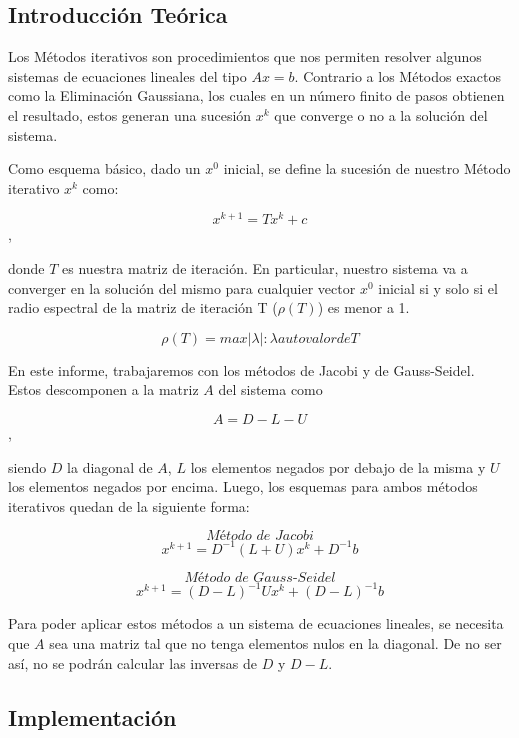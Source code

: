 
\vspace{2em}
\subsection{Introducción Teórica}

Los Métodos iterativos son procedimientos que nos permiten resolver algunos sistemas de ecuaciones lineales del tipo $Ax = b$. Contrario a los Métodos exactos como la Eliminación Gaussiana, los cuales en un número finito de pasos obtienen el resultado, estos generan una sucesión {$x^{k}$} que converge o no a la solución del sistema.

Como esquema básico, dado un $x^{0}$ inicial, se define la sucesión de nuestro Método iterativo {$x^{k}$} como:

\begin{equation}\label{sucesion}
    x^{k+1} = Tx^k + c
\end{equation},

donde $T$ es nuestra matriz de iteración. En particular, nuestro sistema va a converger en la solución del mismo para cualquier vector $x^0$ inicial si y solo si el radio espectral de la matriz de iteración T ($\rho(T)$) es menor a 1.

\begin{equation}\label{radio espectral}
    \rho(T) = max{|\lambda| : \lambda autovalor de T}
\end{equation}

En este informe, trabajaremos con los métodos de Jacobi y de Gauss-Seidel. Estos descomponen a la matriz $A$ del sistema como 

\begin{displaymath}
    A = D - L - U
\end{displaymath},

siendo $D$ la diagonal de $A$, $L$ los elementos negados por debajo de la misma y $U$ los elementos negados por encima. Luego, los esquemas para ambos métodos iterativos quedan de la siguiente forma:

$$\textit{Método de Jacobi}$$
\begin{equation}\label{jacobi}
    x^{k+1} = D^{-1} (L + U) x^k + D^{-1} b
\end{equation}

$$\textit{Método de Gauss-Seidel}$$
\begin{equation}\label{gauss-seidel}
    x^{k+1} = (D - L)^{-1} U x^k + (D - L)^{-1} b
\end{equation}

Para poder aplicar estos métodos a un sistema de ecuaciones lineales, se necesita que $A$ sea una matriz tal que no tenga elementos nulos en la diagonal. De no ser así, no se podrán calcular las inversas de $D$ y $D - L$.


\vspace{2em}
\subsection{Implementación}

